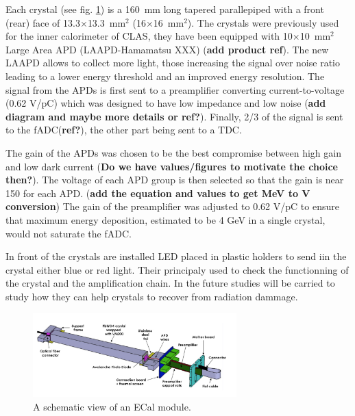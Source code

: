 \documentclass[review]{elsarticle}
\begin{document}
Each crystal (see fig. \ref{Crys}) is a 160~mm long tapered parallepiped 
with a front (rear) face of 13.3$\times$13.3~mm$^ {2}$ 
(16$\times$16~mm$^{2}$). The crystals were previously used for the inner 
calorimeter of CLAS, they have been equipped with 10$\times$10~mm$^ {2}$ 
Large Area APD (LAAPD-Hamamatsu XXX) ({\bf add product ref}). The new 
LAAPD allows to collect more light, those increasing the signal over noise 
ratio leading to a lower energy threshold and an improved energy 
resolution. The signal from the APDs is first sent to a preamplifier
converting current-to-voltage (0.62 V/pC) which was designed to have low 
impedance and low noise ({\bf add diagram and maybe more details or ref?}). 
Finally, 2/3 of the signal is sent to the fADC({\bf ref?}), the other part 
being sent to a TDC.

The gain of the APDs was chosen to be the best compromise between high gain 
and low dark current ({\bf Do we have values/figures to motivate the 
choice then?}). The voltage of each APD group is then selected so that the 
gain is near 150 for each APD. ({\bf add the equation and values to get MeV 
to V conversion}) The gain of the preamplifier was adjusted to 0.62 V/pC to 
ensure that maximum energy deposition, estimated to be 4 GeV in a single 
crystal, would not saturate the fADC.

In front of the crystals are installed LED placed in plastic holders 
to send iin the crystal either blue or red light. Their principaly used
to check the functionning of the crystal and the amplification chain. In
the future studies will be carried to study how they can help crystals to
recover from radiation dammage.

\begin{figure}[ht!]
\centering
\includegraphics[width=0.70\textwidth]{CrystalView.png}
\caption{A schematic view of an ECal module.}
\label{Crys}
\end{figure}
\end{document}
